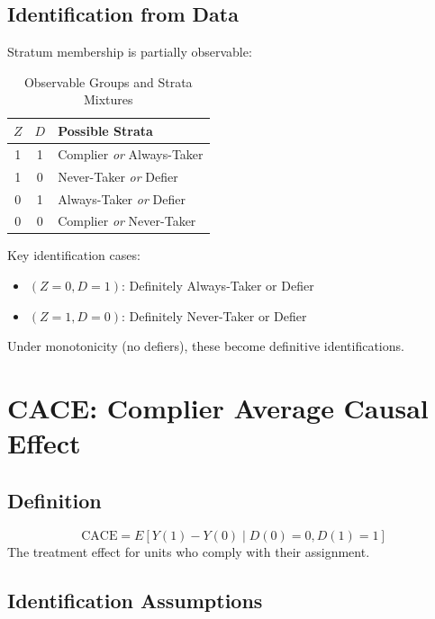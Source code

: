\subsection{Identification from Data}

Stratum membership is partially observable:

\begin{table}[h]
\centering
\caption{Observable Groups and Strata Mixtures}
\begin{tabular}{ccl}
\toprule
$Z$ & $D$ & Possible Strata \\
\midrule
1 & 1 & Complier \textit{or} Always-Taker \\
1 & 0 & Never-Taker \textit{or} Defier \\
0 & 1 & Always-Taker \textit{or} Defier \\
0 & 0 & Complier \textit{or} Never-Taker \\
\bottomrule
\end{tabular}
\end{table}

\begin{insight}
Key identification cases:
\begin{itemize}
\item $(Z=0, D=1)$: Definitely Always-Taker or Defier
\item $(Z=1, D=0)$: Definitely Never-Taker or Defier
\end{itemize}
Under monotonicity (no defiers), these become definitive identifications.
\end{insight}


\section{CACE: Complier Average Causal Effect}

\subsection{Definition}

\begin{definition}
\begin{equation}
\text{CACE} = E[Y(1) - Y(0) \mid D(0) = 0, D(1) = 1]
\end{equation}
The treatment effect for units who comply with their assignment.
\end{definition}

\subsection{Identification Assumptions}

